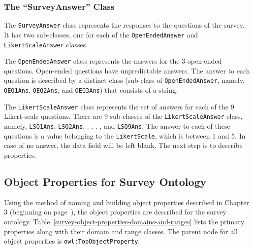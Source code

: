 \begin{doublespace}
\subsubsection{The ``SurveyAnswer'' Class}
\label{subsubsec:surveyansclass}

The {\tt SurveyAnswer} class represents the responses to the questions of the survey. 
It has two sub-classes, one for each of the 
{\tt OpenEndedAnswer} and {\tt LikertScaleAnswer} classes.

The {\tt OpenEndedAnswer} class represents 
the answers for the 3 open-ended questions.
Open-ended questions have unpredictable answers. 
The answer to each question is described by a distinct class (sub-class of {\tt OpenEndedAnswer},
namely, 
{\tt OEQ1Ans}, {\tt OEQ2Ans}, and {\tt OEQ3Ans}) 
that consists of a string.
   
The {\tt LikertScaleAnswer} class represents 
the set of answers for each of the 9 Likert-scale questions. 
There are 9 sub-classes of the {\tt LikertScaleAnswer} class, 
namely, 
{\tt LSQ1Ans}, {\tt LSQ2Ans}, . . . , and {\tt LSQ9Ans}.
The answer to each of these questions is a value belonging to
the {\tt LikertScale},
which is between 1 and 5.
In case of no answer, the data field will be left blank. 
The next step is to describe properties.

\subsection{Object Properties for Survey Ontology}
\label{subsec:surveyobjectproperties}

Using the method of naming and building object properties described in Chapter
3 (beginning on page~\pageref{subsubsec:objectproperties}),
the object properties are described for the survey ontology.
Table~\ref{survey-object-properties-domains-and-ranges} 
lists the primary properties along with their domain and range classes. 
The parent node for all object properties is {\tt owl:TopObjectProperty}.

\begin{table}[h!]
    \centering
    
    \caption{Object Properties and Their Domain and Range}
    \label{survey-object-properties-domains-and-ranges}


\end{table}
\end{doublespace}
